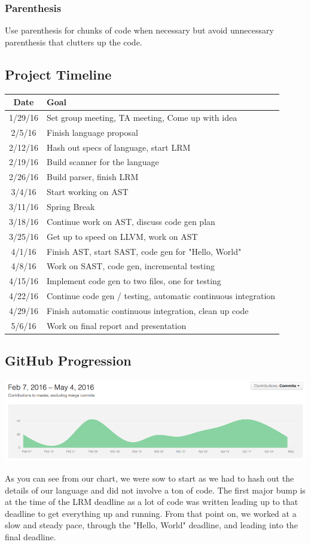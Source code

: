 \documentclass{article}
\begin{document}
\subsubsection{Parenthesis}
Use parenthesis for chunks of code when necessary but avoid unnecessary parenthesis that clutters up the code.
\subsection{Project Timeline}
\begin{tabular}{| c | l |} \hline
	\textbf{Date} & \textbf{Goal} \\ \hline
	1/29/16 & Set group meeting, TA meeting, Come up with idea \\ \hline
	2/5/16 & Finish language proposal \\ \hline
	2/12/16 & Hash out specs of language, start LRM \\ \hline
	2/19/16 & Build scanner for the language \\ \hline
	2/26/16 & Build parser, finish LRM \\ \hline
	3/4/16 & Start working on AST \\ \hline
	3/11/16 & Spring Break \\ \hline
	3/18/16 & Continue work on AST, discuss code gen plan \\ \hline
	3/25/16 & Get up to speed on LLVM, work on AST \\ \hline
	4/1/16 & Finish AST, start SAST, code gen for "Hello, World" \\ \hline
	4/8/16 & Work on SAST, code gen, incremental testing \\ \hline
	4/15/16 & Implement code gen to two files, one for testing \\ \hline
	4/22/16 & Continue code gen / testing, automatic continuous integration \\ \hline
	4/29/16 & Finish automatic continuous integration, clean up code \\ \hline
	5/6/16 & Work on final report and presentation \\ \hline
\end{tabular}

\subsection{GitHub Progression}
\includegraphics[width=\textwidth]{github_stats.png}
\par As you can see from our chart, we were sow to start as we had to hash out the details of our language and did not involve a ton of code.  The first major bump is at the time of the LRM deadline as a lot of code was written leading up to that deadline to get everything up and running.  From that point on, we worked at a slow and steady pace, through the "Hello, World" deadline, and leading into the final deadline.
\end{document}
